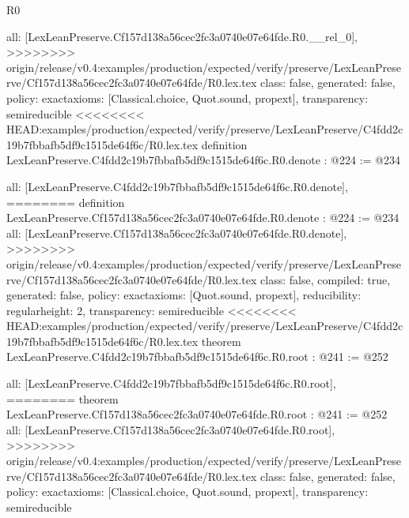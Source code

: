\begin{lexlean}{R0}
\begin{coremodule}
{{{{  all: [LexLeanPreserve.Cf157d138a56cec2fc3a0740e07e64fde.R0.__rel_0],
>>>>>>>> origin/release/v0.4:examples/production/expected/verify/preserve/LexLeanPreserve/Cf157d138a56cec2fc3a0740e07e64fde/R0.lex.tex
  class: false,
  generated: false,
  policy: exact{axioms: [Classical.choice, Quot.sound, propext]},
  transparency: semireducible
}
<<<<<<<< HEAD:examples/production/expected/verify/preserve/LexLeanPreserve/C4fdd2c19b7fbbafb5df9c1515de64f6c/R0.lex.tex
definition LexLeanPreserve.C4fdd2c19b7fbbafb5df9c1515de64f6c.R0.denote : @224 := @234 {
  all: [LexLeanPreserve.C4fdd2c19b7fbbafb5df9c1515de64f6c.R0.denote],
========
definition LexLeanPreserve.Cf157d138a56cec2fc3a0740e07e64fde.R0.denote : @224 := @234 {
  all: [LexLeanPreserve.Cf157d138a56cec2fc3a0740e07e64fde.R0.denote],
>>>>>>>> origin/release/v0.4:examples/production/expected/verify/preserve/LexLeanPreserve/Cf157d138a56cec2fc3a0740e07e64fde/R0.lex.tex
  class: false,
  compiled: true,
  generated: false,
  policy: exact{axioms: [Quot.sound, propext]},
  reducibility: regular{height: 2},
  transparency: semireducible
}
<<<<<<<< HEAD:examples/production/expected/verify/preserve/LexLeanPreserve/C4fdd2c19b7fbbafb5df9c1515de64f6c/R0.lex.tex
theorem LexLeanPreserve.C4fdd2c19b7fbbafb5df9c1515de64f6c.R0.root : @241 := @252 {
  all: [LexLeanPreserve.C4fdd2c19b7fbbafb5df9c1515de64f6c.R0.root],
========
theorem LexLeanPreserve.Cf157d138a56cec2fc3a0740e07e64fde.R0.root : @241 := @252 {
  all: [LexLeanPreserve.Cf157d138a56cec2fc3a0740e07e64fde.R0.root],
>>>>>>>> origin/release/v0.4:examples/production/expected/verify/preserve/LexLeanPreserve/Cf157d138a56cec2fc3a0740e07e64fde/R0.lex.tex
  class: false,
  generated: false,
  policy: exact{axioms: [Classical.choice, Quot.sound, propext]},
  transparency: semireducible
}

}}}}}
\end{coremodule}
\end{lexlean}
